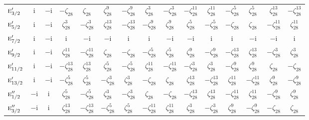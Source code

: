 \documentclass[10pt,a4paper]{article}
\numberwithin{equation}{section}
\newcommand{\irr}[1]{\text{\normalfont\scshape #1}}
\newcommand{\iunit}{\mathrm{i}}
\newcommand{\rootunity}[1]{\zeta_{#1}}
\begin{document}
{\begin{longtable}{@{}lcccccccccccccc@{}}
$\irr{e}_{3/2}'$ & $\iunit{}$ & $-\iunit{}$ & $-\rootunity{28}$ & $\rootunity{28}$ & $\rootunity{28}^{9}$ & $-\rootunity{28}^{9}$ & $\rootunity{28}^{3}$ & $-\rootunity{28}^{3}$ & $-\rootunity{28}^{11}$ & $\rootunity{28}^{11}$ & $-\rootunity{28}^{5}$ & $\rootunity{28}^{5}$ & $\rootunity{28}^{13}$ & $-\rootunity{28}^{13}$\\
$\irr{e}_{5/2}'$ & $\iunit{}$ & $-\iunit{}$ & $\rootunity{28}^{3}$ & $-\rootunity{28}^{3}$ & $\rootunity{28}^{13}$ & $-\rootunity{28}^{13}$ & $-\rootunity{28}^{9}$ & $\rootunity{28}^{9}$ & $\rootunity{28}^{5}$ & $-\rootunity{28}^{5}$ & $-\rootunity{28}$ & $\rootunity{28}$ & $-\rootunity{28}^{11}$ & $\rootunity{28}^{11}$\\
$\irr{e}_{7/2}'$ & $\iunit{}$ & $-\iunit{}$ & $\iunit{}$ & $-\iunit{}$ & $-\iunit{}$ & $\iunit{}$ & $\iunit{}$ & $-\iunit{}$ & $-\iunit{}$ & $\iunit{}$ & $\iunit{}$ & $-\iunit{}$ & $-\iunit{}$ & $\iunit{}$\\
$\irr{e}_{9/2}'$ & $\iunit{}$ & $-\iunit{}$ & $\rootunity{28}^{11}$ & $-\rootunity{28}^{11}$ & $\rootunity{28}$ & $-\rootunity{28}$ & $-\rootunity{28}^{5}$ & $\rootunity{28}^{5}$ & $\rootunity{28}^{9}$ & $-\rootunity{28}^{9}$ & $-\rootunity{28}^{13}$ & $\rootunity{28}^{13}$ & $-\rootunity{28}^{3}$ & $\rootunity{28}^{3}$\\
$\irr{e}_{11/2}'$ & $\iunit{}$ & $-\iunit{}$ & $-\rootunity{28}^{13}$ & $\rootunity{28}^{13}$ & $\rootunity{28}^{5}$ & $-\rootunity{28}^{5}$ & $\rootunity{28}^{11}$ & $-\rootunity{28}^{11}$ & $-\rootunity{28}^{3}$ & $\rootunity{28}^{3}$ & $-\rootunity{28}^{9}$ & $\rootunity{28}^{9}$ & $\rootunity{28}$ & $-\rootunity{28}$\\
$\irr{e}_{13/2}'$ & $\iunit{}$ & $-\iunit{}$ & $-\rootunity{28}^{5}$ & $\rootunity{28}^{5}$ & $-\rootunity{28}^{3}$ & $\rootunity{28}^{3}$ & $-\rootunity{28}$ & $\rootunity{28}$ & $\rootunity{28}^{13}$ & $-\rootunity{28}^{13}$ & $\rootunity{28}^{11}$ & $-\rootunity{28}^{11}$ & $\rootunity{28}^{9}$ & $-\rootunity{28}^{9}$\\
$\irr{e}_{1/2}''$ & $-\iunit{}$ & $\iunit{}$ & $\rootunity{28}^{5}$ & $-\rootunity{28}^{5}$ & $\rootunity{28}^{3}$ & $-\rootunity{28}^{3}$ & $\rootunity{28}$ & $-\rootunity{28}$ & $-\rootunity{28}^{13}$ & $\rootunity{28}^{13}$ & $-\rootunity{28}^{11}$ & $\rootunity{28}^{11}$ & $-\rootunity{28}^{9}$ & $\rootunity{28}^{9}$\\
$\irr{e}_{3/2}''$ & $-\iunit{}$ & $\iunit{}$ & $\rootunity{28}^{13}$ & $-\rootunity{28}^{13}$ & $-\rootunity{28}^{5}$ & $\rootunity{28}^{5}$ & $-\rootunity{28}^{11}$ & $\rootunity{28}^{11}$ & $\rootunity{28}^{3}$ & $-\rootunity{28}^{3}$ & $\rootunity{28}^{9}$ & $-\rootunity{28}^{9}$ & $-\rootunity{28}$ & $\rootunity{28}$\\

\end{longtable}}
\end{document}
